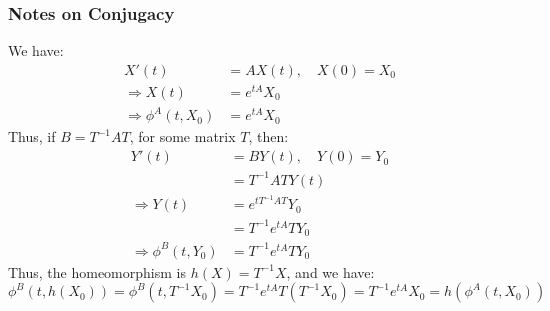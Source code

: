 \documentclass[crop=false,class=book,oneside]{standalone}
\begin{document}
            \subsubsection{Notes on Conjugacy}
                We have:
                \begin{align*}
                    X'(t)&=AX(t),
                    \quad
                    X(0)=X_{0}\\
                    \Rightarrow
                    X(t)&=e^{tA}X_{0}\\
                    \Rightarrow
                    \phi^{A}(t,X_{0})
                    &=e^{tA}X_{0}
                \end{align*}
                Thus, if $B=T^{-1}AT$, for some matrix $T$, then:
                \begin{align*}
                    Y'(t)&=BY(t),
                    \quad
                    Y(0)=Y_{0}\\
                    &=T^{-1}ATY(t)\\
                    \Rightarrow
                    Y(t)
                    &=e^{tT^{-1}AT}Y_{0}\\
                    &=T^{-1}e^{tA}TY_{0}\\
                    \Rightarrow
                    \phi^{B}(t,Y_{0})
                    &=T^{-1}e^{tA}TY_{0}
                \end{align*}
                Thus, the homeomorphism is $h(X)=T^{-1}X$,
                and we have:
                \begin{equation*}
                    \phi^{B}(t,h(X_{0}))
                    =\phi^{B}(t,T^{-1}X_{0})
                    =T^{-1}e^{tA}T(T^{-1}X_{0})
                    =T^{-1}e^{tA}X_{0}
                    =h(\phi^{A}(t,X_{0}))
                \end{equation*}
\end{document}
